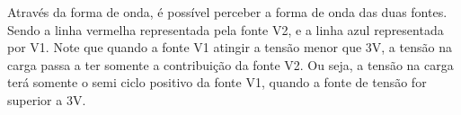 Através da forma de onda, é possível perceber a forma de onda das duas fontes. Sendo a linha vermelha representada pela fonte V2, e a linha azul representada por V1. Note que quando a fonte V1 atingir a tensão menor que 3V, a tensão na carga passa a ter somente a contribuição da fonte V2. Ou seja, a tensão na carga terá somente o semi ciclo positivo da fonte V1, quando a fonte de tensão for superior a 3V.
